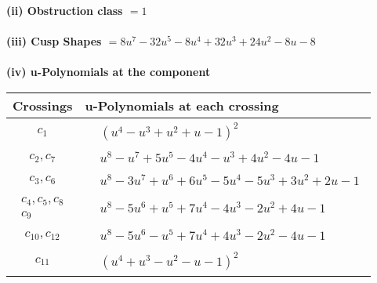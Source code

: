 \documentclass[1p]{elsarticle_modified}
\theoremstyle{definition}
\begin{document}
\flushleft \textbf{(ii) Obstruction class $= 1$}\\~\\
\flushleft \textbf{(iii) Cusp Shapes $= 8 u^7-32 u^5-8 u^4+32 u^3+24 u^2-8 u-8$}\\~\\
\newpage\renewcommand{\arraystretch}{1}
\flushleft \textbf{(iv) u-Polynomials at the component}\newline \\
\begin{tabular}{m{50pt}|m{274pt}}
Crossings & \hspace{64pt}u-Polynomials at each crossing \\
\hline $$\begin{aligned}c_{1}\end{aligned}$$&$\begin{aligned}
&(u^4- u^3+u^2+u-1)^2
\end{aligned}$\\
\hline $$\begin{aligned}c_{2},c_{7}\end{aligned}$$&$\begin{aligned}
&u^8- u^7+5 u^5-4 u^4- u^3+4 u^2-4 u-1
\end{aligned}$\\
\hline $$\begin{aligned}c_{3},c_{6}\end{aligned}$$&$\begin{aligned}
&u^8-3 u^7+u^6+6 u^5-5 u^4-5 u^3+3 u^2+2 u-1
\end{aligned}$\\
\hline $$\begin{aligned}c_{4},c_{5},c_{8}\\c_{9}\end{aligned}$$&$\begin{aligned}
&u^8-5 u^6+u^5+7 u^4-4 u^3-2 u^2+4 u-1
\end{aligned}$\\
\hline $$\begin{aligned}c_{10},c_{12}\end{aligned}$$&$\begin{aligned}
&u^8-5 u^6- u^5+7 u^4+4 u^3-2 u^2-4 u-1
\end{aligned}$\\
\hline $$\begin{aligned}c_{11}\end{aligned}$$&$\begin{aligned}
&(u^4+u^3- u^2- u-1)^2
\end{aligned}$\\
\hline
\end{tabular}\\~\\
\end{document}
